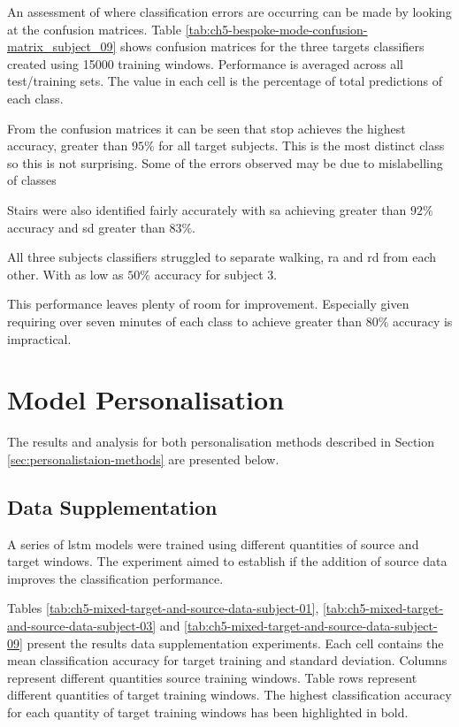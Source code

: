 An assessment of where classification errors are occurring can be made by looking at the confusion matrices. Table \ref{tab:ch5-bespoke-mode-confusion-matrix_subject_09} shows confusion matrices for the three targets classifiers created using 15000 training windows. Performance is averaged across all test/training sets. The value in each cell is the percentage of total predictions of each class.

From the confusion matrices it can be seen that stop achieves the highest accuracy, greater than $95\%$ for all target subjects. This is the most distinct class so this is not surprising. Some of the errors observed may be due to mislabelling of classes

Stairs were also identified fairly accurately with \acrlong{sa} achieving greater than $92\%$ accuracy and \acrlong{sd} greater than $83\%$.

All three subjects classifiers struggled to separate walking, \acrlong{ra} and \acrlong{rd} from each other. With as low as $50\%$ accuracy for subject 3.

This performance leaves plenty of room for improvement. Especially given requiring over seven minutes of each class to achieve greater than $80\%$ accuracy is impractical.


\section{Model Personalisation}
\label{sec:model-personalisation-results}
The results and analysis for both personalisation methods described in Section \ref{sec:personalistaion-methods} are presented below.

\subsection{Data Supplementation}
A series of \acrshort{lstm} models were trained using different quantities of source and target windows. The experiment aimed to establish if the addition of source data improves the classification performance.

Tables \ref{tab:ch5-mixed-target-and-source-data-subject-01}, \ref{tab:ch5-mixed-target-and-source-data-subject-03} and \ref{tab:ch5-mixed-target-and-source-data-subject-09} present the results data supplementation experiments. Each cell contains the mean classification accuracy for target training and standard deviation. Columns represent different quantities source training windows. Table rows represent different quantities of target training windows. The highest classification accuracy for each quantity of target training windows has been highlighted in bold.

